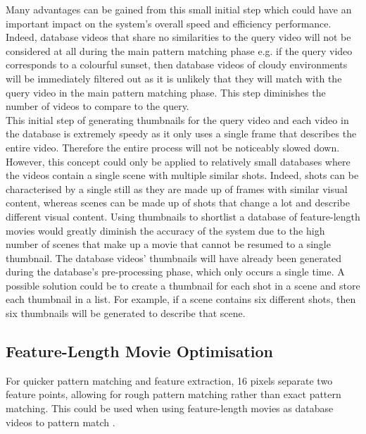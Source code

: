 Many advantages can be gained from this small initial step which could have an important impact on the system's overall speed and efficiency performance. Indeed, database videos that share no similarities to the query video will not be considered at all during the main pattern matching phase e.g. if the query video corresponds to a colourful sunset, then database videos of cloudy environments will be immediately filtered out as it is unlikely that they will match with the query video in the main pattern matching phase. This step diminishes the number of videos to compare to the query.\\

This initial step of generating thumbnails for the query video and each video in the database is extremely speedy as it only uses a single frame that describes the entire video. Therefore the entire process will not be noticeably slowed down. However, this concept could only be applied to relatively small databases where the videos contain a single scene with multiple similar shots. Indeed, shots can be characterised by a single still as they are made up of frames with similar visual content, whereas scenes can be made up of shots that change a lot and describe different visual content. Using thumbnails to shortlist a database of feature-length movies would greatly diminish the accuracy of the system due to the high number of scenes that make up a movie that cannot be resumed to a single thumbnail. The database videos' thumbnails will have already been generated during the database's pre-processing phase, which only occurs a single time. A possible solution could be to create a thumbnail for each shot in a scene and store each thumbnail in a list. For example, if a scene contains six different shots, then six thumbnails will be generated to describe that scene.


\subsection{Feature-Length Movie Optimisation}

For quicker pattern matching and feature extraction, 16 pixels separate two feature points, allowing for rough pattern matching rather than exact pattern matching. This could be used when using feature-length movies as database videos to pattern match \cite{okabe2018animating}.\\

